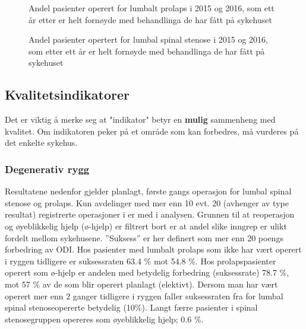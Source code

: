 \begin{figure}[h] 
\caption{Andel pasienter operert for lumbalt prolaps i 2015 og 2016, som ett år etter er helt fornøyde med behandlinga de har fått på sykehuset}
\label{fig:FornoydAvdPro}
\end{figure}

\begin{figure}[h] 
\caption{Andel pasienter opertert for lumbal spinal stenose i 2015 og 2016, som etter ett år er helt fornøyde med behandlinga de har fått på sykehuset}
\label{fig:FornoydAvdSS}
\end{figure}

\clearpage




      



\subsection{Kvalitetsindikatorer}
Det er viktig å merke seg at "indikator"  betyr en \textbf{mulig} sammenheng 
med kvalitet. Om indikatoren peker på et område som kan forbedres, må vurderes på det enkelte sykehus.

\subsubsection{Degenerativ rygg}





      
      Resultatene nedenfor gjelder planlagt, første gangs operasjon for lumbal spinal stenose og prolaps.
Kun avdelinger med mer enn 10 evt. 20 (avhenger av type resultat) registrerte operasjoner i er med i
analysen.
Grunnen til at reoperasjon og øyeblikkelig hjelp (ø-hjelp)
er filtrert bort er at andel slike inngrep er ulikt fordelt mellom sykehusene. 
      ''Suksess'' er her definert som mer enn 20 poengs forbedring av ODI. 
Hos pasienter med lumbalt prolaps som ikke har vært operert i ryggen tidligere er 
suksessraten 63.4 \% mot 54.8 \%. Hos prolapspasienter operert som ø-hjelp er andelen med betydelig forbedring 
(suksessrate)  78.7 \%, mot 57 \% av de som blir 
operert planlagt (elektivt). Dersom man har vært operert mer enn 2 ganger tidligere i
ryggen faller suksessraten fra  for lumbal spinal stenoseopererte betydelig (10\%). Langt færre pasienter i spinal stenosegruppen opereres som øyeblikkelig hjelp; 0.6 \%.  

